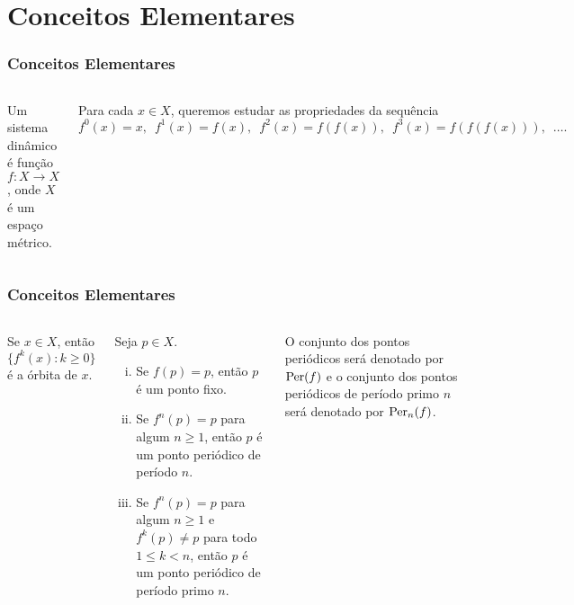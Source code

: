 \section{Conceitos Elementares}


\begin{frame}
\frametitle{Conceitos Elementares}
\begin{columns}
\column{\dimexpr\paperwidth-15pt}

\begin{definition}
Um sistema dinâmico é função $f: X \to X$, onde $X$ é um espaço métrico.
\end{definition}

Para cada $x \in X$, queremos estudar as propriedades da sequência
$$f^0(x) = x, \,\,\, f^1(x) = f(x), \,\,\, f^2(x) = f(f(x)), \,\,\, f^3(x) = f(f(f(x))), \,\,\, \dots.$$

\end{columns}
\end{frame}


\begin{frame}
\vspace{5pt}
\frametitle{Conceitos Elementares}      
\begin{columns}
\column{\dimexpr\paperwidth-15pt}

\begin{definition}
Se $x \in X$, então $\lbrace f^k(x) : k \geq 0 \rbrace$ é a órbita de $x$.
\end{definition}

\vspace{10pt}

\begin{definition}
Seja $p \in X$.
\begin{enumerate}[i.]
\item Se $f(p) = p$, então $p$ é um ponto fixo.

\item Se $f^n(p) = p$ para algum $n \geq 1$, então $p$ é um ponto periódico de período $n$.

\item Se $f^n(p) = p$ para algum $n \geq 1$ e $f^k(p) \neq p$ para todo $1 \leq k < n$, então $p$ é um ponto periódico de período primo $n$.
\end{enumerate}
\end{definition}

O conjunto dos pontos periódicos será denotado por $\operatorname{Per}(f)$ e o conjunto dos pontos periódicos de período primo $n$ será denotado por $\operatorname{Per}_n(f)$.

\end{columns}
\end{frame}

